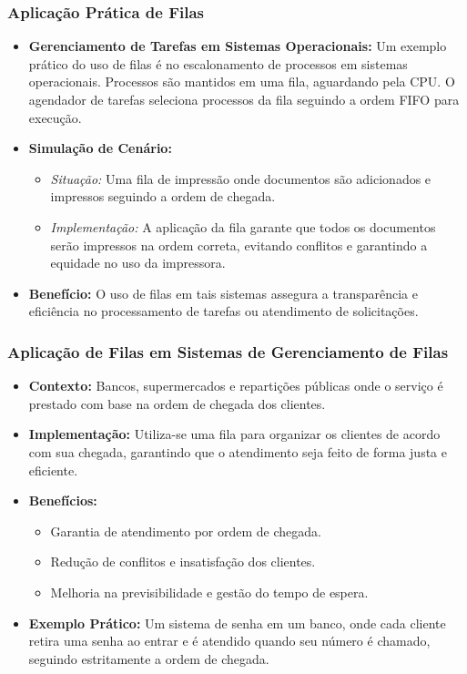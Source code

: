 \begin{frame}[fragile]
  \frametitle{Aplicação Prática de Filas}
  \begin{itemize}
    \item \textbf{Gerenciamento de Tarefas em Sistemas Operacionais:} Um exemplo prático do uso de filas é no escalonamento de processos em sistemas operacionais. Processos são mantidos em uma fila, aguardando pela CPU. O agendador de tarefas seleciona processos da fila seguindo a ordem FIFO para execução.
    \item \textbf{Simulação de Cenário:}
      \begin{itemize}
        \item \textit{Situação:} Uma fila de impressão onde documentos são adicionados e impressos seguindo a ordem de chegada.
        \item \textit{Implementação:} A aplicação da fila garante que todos os documentos serão impressos na ordem correta, evitando conflitos e garantindo a equidade no uso da impressora.
      \end{itemize}
    \item \textbf{Benefício:} O uso de filas em tais sistemas assegura a transparência e eficiência no processamento de tarefas ou atendimento de solicitações.
  \end{itemize}
\end{frame}
\begin{frame}[fragile]
  \frametitle{Aplicação de Filas em Sistemas de Gerenciamento de Filas}
  \begin{itemize}
    \item \textbf{Contexto:} Bancos, supermercados e repartições públicas onde o serviço é prestado com base na ordem de chegada dos clientes.
    \item \textbf{Implementação:} Utiliza-se uma fila para organizar os clientes de acordo com sua chegada, garantindo que o atendimento seja feito de forma justa e eficiente.
    \item \textbf{Benefícios:}
      \begin{itemize}
        \item Garantia de atendimento por ordem de chegada.
        \item Redução de conflitos e insatisfação dos clientes.
        \item Melhoria na previsibilidade e gestão do tempo de espera.
      \end{itemize}
    \item \textbf{Exemplo Prático:} Um sistema de senha em um banco, onde cada cliente retira uma senha ao entrar e é atendido quando seu número é chamado, seguindo estritamente a ordem de chegada.
  \end{itemize}
\end{frame}

